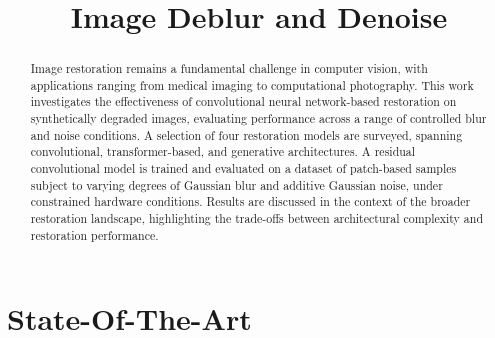 \documentclass[conference]{IEEEtran}
\begin{document}
\title{Image Deblur and Denoise}

\author{
  \and
}

\maketitle

\begin{abstract}
Image restoration remains a fundamental challenge in computer vision, with
applications ranging from medical imaging to computational photography. This work
investigates the effectiveness of convolutional neural network-based restoration
on synthetically degraded images, evaluating performance across a range of
controlled blur and noise conditions. A selection of four restoration models are
surveyed, spanning convolutional, transformer-based, and generative
architectures. A residual convolutional model is trained and evaluated
on a dataset of patch-based samples subject to varying degrees of Gaussian blur
and additive Gaussian noise, under constrained hardware conditions. Results are
discussed in the context of the broader restoration landscape, highlighting the
trade-offs between architectural complexity and restoration performance.
\end{abstract}

\section{State-Of-The-Art}

\end{document}
